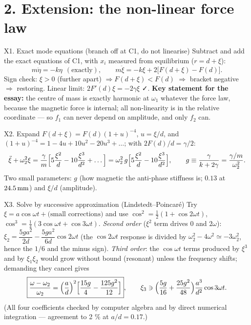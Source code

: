 \documentclass[11pt,a4paper]{article}
\begin{document}
\section*{2. Extension: the non-linear force law}
\begin{stepbox}{X1. Exact mode equations (branch off at C1, do not linearise)}
Subtract and add the exact equations of C1, with $x_i$ measured from equilibrium ($r=d+\xi$):
\[ m\ddot\eta=-k\eta\ \ (\text{exactly}),\qquad m\ddot\xi=-k\xi+2\bigl[F(d+\xi)-F(d)\bigr]. \]
Sign check: $\xi>0$ (further apart) $\Rightarrow F(d+\xi)<F(d)$ $\Rightarrow$ bracket negative $\Rightarrow$ restoring. Linear limit: $2F'(d)\xi=-2\gamma\xi$ ✓. \textbf{Key statement for the essay:} the centre of mass is exactly harmonic at $\omega_1$ whatever the force law, because the magnetic force is internal; all non-linearity is in the relative coordinate --- so $f_1$ can never depend on amplitude, and only $f_2$ can.
\end{stepbox}
\begin{stepbox}{X2. Expand}
$F(d+\xi)=F(d)(1+u)^{-4}$, $u=\xi/d$, and $(1+u)^{-4}=1-4u+10u^2-20u^3+\dots$; with $2F(d)/d=\gamma/2$:
\[ \ddot\xi+\omega_2^2\xi=\frac{\gamma}{m}\Bigl[5\frac{\xi^2}{d}-10\frac{\xi^3}{d^2}+\dots\Bigr]=\omega_2^2\,g\Bigl[5\frac{\xi^2}{d}-10\frac{\xi^3}{d^2}\Bigr],\qquad g\equiv\frac{\gamma}{k+2\gamma}=\frac{\gamma/m}{\omega_2^2}. \]
Two small parameters: $g$ (how magnetic the anti-phase stiffness is; $0.13$ at $24.5\,\mathrm{mm}$) and $\xi/d$ (amplitude).
\end{stepbox}
\begin{stepbox}{X3. Solve by successive approximation (Lindstedt--Poincar\'e)}
Try $\xi=a\cos\omega t+\text{(small corrections)}$ and use $\cos^2=\tfrac12(1+\cos2\omega t)$, $\cos^3=\tfrac14(3\cos\omega t+\cos3\omega t)$.
\emph{Second order} ($\xi^2$ term drives $0$ and $2\omega$): $\xi_2=\dfrac{5ga^2}{2d}-\dfrac{5ga^2}{6d}\cos2\omega t$ (the $\cos2\omega t$ response is divided by $\omega_2^2-4\omega^2\simeq-3\omega_2^2$, hence the $1/6$ and the minus sign).
\emph{Third order}: the $\cos\omega t$ terms produced by $\xi^3$ and by $\xi_1\xi_2$ would grow without bound (resonant) unless the frequency shifts; demanding they cancel gives
\[ \boxed{\frac{\omega-\omega_2}{\omega_2}=\Bigl(\frac ad\Bigr)^2\Bigl[\frac{15g}{4}-\frac{125g^2}{12}\Bigr]},\qquad \xi_3\ni\Bigl(\frac{5g}{16}+\frac{25g^2}{48}\Bigr)\frac{a^3}{d^2}\cos3\omega t . \]
(All four coefficients checked by computer algebra and by direct numerical integration --- agreement to 2 \% at $a/d=0.17$.)
\end{stepbox}
\end{document}
